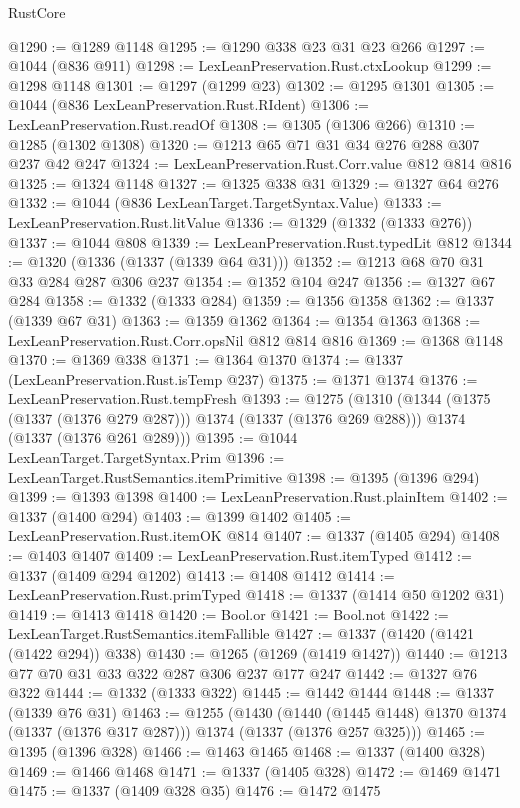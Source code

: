 \begin{lexlean}{RustCore}
\begin{coremodule}
@1290 := @1289 @1148
@1295 := @1290 @338 @23 @31 @23 @266
@1297 := @1044 (@836 @911)
@1298 := LexLeanPreservation.Rust.ctxLookup
@1299 := @1298 @1148
@1301 := @1297 (@1299 @23)
@1302 := @1295 @1301
@1305 := @1044 (@836 LexLeanPreservation.Rust.RIdent)
@1306 := LexLeanPreservation.Rust.readOf
@1308 := @1305 (@1306 @266)
@1310 := @1285 (@1302 @1308)
@1320 := @1213 @65 @71 @31 @34 @276 @288 @307 @237 @42 @247
@1324 := LexLeanPreservation.Rust.Corr.value @812 @814 @816
@1325 := @1324 @1148
@1327 := @1325 @338 @31
@1329 := @1327 @64 @276
@1332 := @1044 (@836 LexLeanTarget.TargetSyntax.Value)
@1333 := LexLeanPreservation.Rust.litValue
@1336 := @1329 (@1332 (@1333 @276))
@1337 := @1044 @808
@1339 := LexLeanPreservation.Rust.typedLit @812
@1344 := @1320 (@1336 (@1337 (@1339 @64 @31)))
@1352 := @1213 @68 @70 @31 @33 @284 @287 @306 @237
@1354 := @1352 @104 @247
@1356 := @1327 @67 @284
@1358 := @1332 (@1333 @284)
@1359 := @1356 @1358
@1362 := @1337 (@1339 @67 @31)
@1363 := @1359 @1362
@1364 := @1354 @1363
@1368 := LexLeanPreservation.Rust.Corr.opsNil @812 @814 @816
@1369 := @1368 @1148
@1370 := @1369 @338
@1371 := @1364 @1370
@1374 := @1337 (LexLeanPreservation.Rust.isTemp @237)
@1375 := @1371 @1374
@1376 := LexLeanPreservation.Rust.tempFresh
@1393 := @1275
    (@1310
      (@1344 (@1375 (@1337 (@1376 @279 @287))) @1374 (@1337 (@1376 @269 @288)))
      @1374
      (@1337 (@1376 @261 @289)))
@1395 := @1044 LexLeanTarget.TargetSyntax.Prim
@1396 := LexLeanTarget.RustSemantics.itemPrimitive
@1398 := @1395 (@1396 @294)
@1399 := @1393 @1398
@1400 := LexLeanPreservation.Rust.plainItem
@1402 := @1337 (@1400 @294)
@1403 := @1399 @1402
@1405 := LexLeanPreservation.Rust.itemOK @814
@1407 := @1337 (@1405 @294)
@1408 := @1403 @1407
@1409 := LexLeanPreservation.Rust.itemTyped
@1412 := @1337 (@1409 @294 @1202)
@1413 := @1408 @1412
@1414 := LexLeanPreservation.Rust.primTyped
@1418 := @1337 (@1414 @50 @1202 @31)
@1419 := @1413 @1418
@1420 := Bool.or
@1421 := Bool.not
@1422 := LexLeanTarget.RustSemantics.itemFallible
@1427 := @1337 (@1420 (@1421 (@1422 @294)) @338)
@1430 := @1265 (@1269 (@1419 @1427))
@1440 := @1213 @77 @70 @31 @33 @322 @287 @306 @237 @177 @247
@1442 := @1327 @76 @322
@1444 := @1332 (@1333 @322)
@1445 := @1442 @1444
@1448 := @1337 (@1339 @76 @31)
@1463 := @1255
    (@1430
      (@1440 (@1445 @1448) @1370 @1374 (@1337 (@1376 @317 @287)))
      @1374
      (@1337 (@1376 @257 @325)))
@1465 := @1395 (@1396 @328)
@1466 := @1463 @1465
@1468 := @1337 (@1400 @328)
@1469 := @1466 @1468
@1471 := @1337 (@1405 @328)
@1472 := @1469 @1471
@1475 := @1337 (@1409 @328 @35)
@1476 := @1472 @1475

\end{coremodule}
\end{lexlean}
